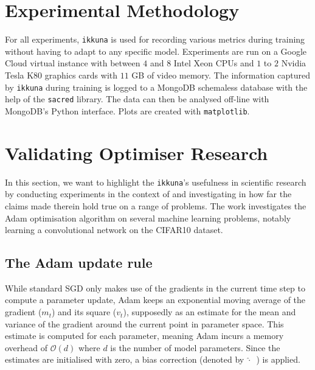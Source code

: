 \section{Experimental Methodology}%
\label{sec:experimental_methodology}

For all experiments, \texttt{ikkuna} is used for recording various metrics
during training without having to adapt to any specific model. Experiments are
run on a Google Cloud virtual instance with between $4$ and $8$ Intel Xeon CPUs
and $1$ to $2$  Nvidia Tesla K80 graphics cards with $11$ GB of video memory. The
information captured by \texttt{ikkuna} during training is logged to a MongoDB
schemaless database with the help of the \texttt{sacred} library. The data can
then be analysed off-line with MongoDB's Python interface. Plots are created
with \texttt{matplotlib}. %

\section{Validating Optimiser Research}%
\label{sec:adam}

In this section, we want to highlight the \texttt{ikkuna}'s usefulness in
scientific research by conducting experiments in the context of
\citep{kingma2014adam} and investigating in how far the claims made therein hold
true on a range of problems. The work investigates the Adam optimisation
algorithm on several machine learning problems, notably learning a convolutional
network on the CIFAR10 dataset.

\subsection{The Adam update rule}%
\label{sub:the_adam_update_rule}

While standard SGD only makes use of the gradients in the current time step to
compute a parameter update, Adam keeps an exponential moving average of the
gradient ($m_t$) and its square ($v_t$), supposedly as an estimate for the mean
and variance of the gradient around the current point in parameter space. This
estimate is computed for each parameter, meaning Adam incurs a memory overhead
of $\mathcal{O}(d)$ where $d$ is the number of model parameters. Since the
estimates are initialised with zero, a bias correction (denoted by
$\widehat{\cdot}$~) is applied.

